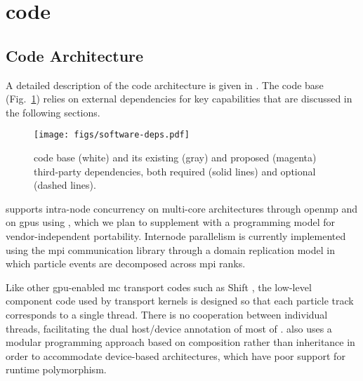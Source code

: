 \section{\celeritas code}

\subsection{Code Architecture}

A detailed description of the \celeritas code architecture is given in
\textcite{johnson_2021}. The code base (Fig.~\ref{fig:celeritas-code-base})
relies on external dependencies for key capabilities that are discussed in the
following sections.
\begin{figure}
  \centering
  \texttt{[image: figs/software-deps.pdf]}
  \caption{\celeritas code base (white) and its existing (gray) and proposed
    (magenta) third-party dependencies, both required (solid lines) and optional
    (dashed lines).}
  \label{fig:celeritas-code-base}
\end{figure}

\celeritas supports intra-node concurrency on multi-core architectures through
\acs{openmp} and on \nvidia \acp{gpu} using \cuda, which we plan to supplement
with a programming model for vendor-independent portability.  Internode
parallelism is currently implemented using the \ac{mpi} communication library
through a domain replication model in which particle events are decomposed
across \ac{mpi} ranks.

Like other \ac{gpu}-enabled \ac{mc} transport codes such as Shift
\cite{pandya_implementation_2016,hamilton_multigroup_2018,
hamilton_continuous-energy_2019,hamilton_domain_2022}, the low-level component
code used by transport kernels is designed so that each particle track
corresponds to a single thread. There is no cooperation between individual
threads, facilitating the dual host/device annotation of most of \celeritas.
\celeritas also uses a modular programming approach based on composition rather
than inheritance in order to accommodate device-based architectures, which have
poor support for runtime polymorphism.

